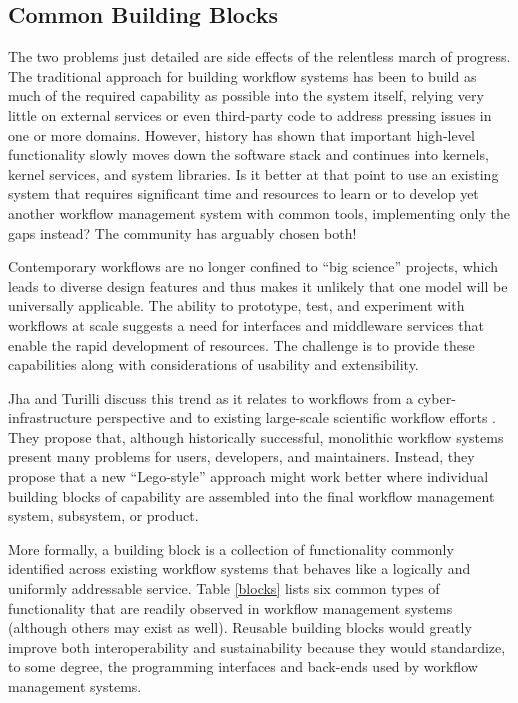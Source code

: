 \subsection{Common Building Blocks}\label{buildings-blocks}

The two problems just detailed are side effects of the relentless march of
progress. The traditional approach for building workflow systems has been to
build as much of the required capability as possible into the system itself,
relying very little on external services or even third-party code to address
pressing issues in one or more domains. However, history has shown that
important high-level functionality slowly moves down the software stack and
continues into kernels, kernel services, and system libraries. Is it better at
that point to use an existing system that requires significant time and resources
to learn or to develop yet another workflow management system with common
tools, implementing only the gaps instead? The community has arguably chosen
both!

Contemporary workflows are no longer confined to ``big science'' projects,
which leads to diverse design features and thus makes it unlikely that one
model will be universally applicable. The ability to prototype, test, and
experiment with workflows at scale suggests a need for interfaces and
middleware services that enable the rapid development of resources. The
challenge is to provide these capabilities along with considerations of
usability and extensibility.

Jha and Turilli discuss this trend as it relates to workflows from a 
cyber-infrastructure perspective and to existing large-scale scientific
workflow efforts \cite{jha_building_2016}. They propose that, although
historically successful, monolithic workflow systems present many problems for
users, developers, and maintainers. Instead, they propose that a new
``Lego-style'' approach might work better where individual building blocks of
capability are assembled into the final workflow management system, subsystem,
or product.

More formally, a building block is a collection of functionality commonly
identified across existing workflow systems that behaves like a logically and
uniformly addressable service. Table \ref{blocks} lists six common types of
functionality that are readily observed in workflow management systems
(although others may exist as well). Reusable building blocks would greatly
improve both interoperability and sustainability because they would
standardize, to some degree, the programming interfaces and back-ends used by
workflow management systems.

